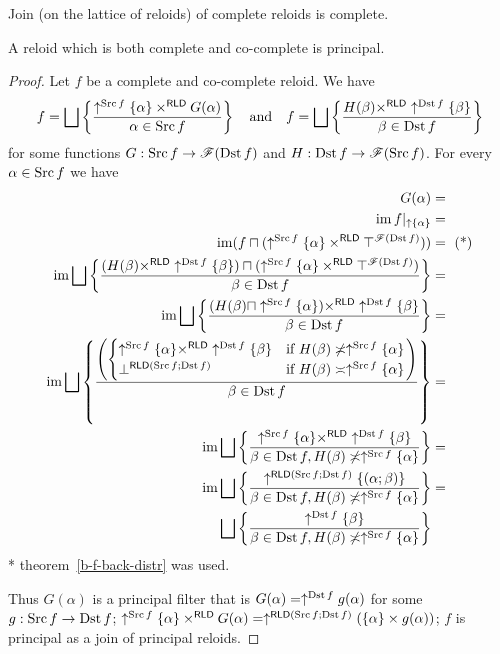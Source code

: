 \begin{obvious}
Join (on the lattice of reloids) of complete reloids is complete.\end{obvious}
\begin{thm}
A reloid which is both complete and co-complete is principal.\end{thm}
\begin{proof}
Let $f$ be a complete and co-complete reloid. We have
\[
f=\bigsqcup\left\{ \frac{\uparrow^{\operatorname{Src} f}\{\alpha\}\times^{\mathsf{RLD}}G(\alpha)}{\alpha\in\operatorname{Src} f}\right\}\quad\text{and}\quad f=\bigsqcup\left\{ \frac{H(\beta)\times^{\mathsf{RLD}}\uparrow^{\operatorname{Dst} f}\{\beta\}}{\beta\in\operatorname{Dst} f}\right\}
\]
for some functions $G:\operatorname{Src} f\rightarrow\mathscr{F}(\operatorname{Dst} f)$ and $H:\operatorname{Dst} f\rightarrow\mathscr{F}(\operatorname{Src} f)$.
For every $\alpha\in\operatorname{Src} f$ we have
\begin{align*}
G(\alpha) & =\\
\operatorname{im} f|_{\uparrow \{\alpha\}} & =\\
\operatorname{im}(f\sqcap(\uparrow^{\operatorname{Src} f}\{\alpha\}\times^{\mathsf{RLD}}\top^{\mathscr{F}(\operatorname{Dst} f)})) & =\text{ (*)}\\
\operatorname{im}\bigsqcup\left\{ \frac{(H(\beta)\times^{\mathsf{RLD}}\uparrow^{\operatorname{Dst} f}\{\beta\})\sqcap(\uparrow^{\operatorname{Src} f}\{\alpha\}\times^{\mathsf{RLD}}\top^{\mathscr{F}(\operatorname{Dst} f)})}{\beta\in\operatorname{Dst} f}\right\} & =\\
\operatorname{im}\bigsqcup\left\{ \frac{(H(\beta)\sqcap\uparrow^{\operatorname{Src} f}\{\alpha\})\times^{\mathsf{RLD}}\uparrow^{\operatorname{Dst} f}\{\beta\}}{\beta\in\operatorname{Dst} f}\right\} & =\\
\operatorname{im}\bigsqcup\left\{ \frac{\left(\begin{cases}
\uparrow^{\operatorname{Src} f}\{\alpha\}\times^{\mathsf{RLD}}\uparrow^{\operatorname{Dst} f}\{\beta\} & \text{if }H(\beta)\not\asymp\uparrow^{\operatorname{Src} f}\{\alpha\}\\
\bot^{\mathsf{RLD}(\operatorname{Src} f;\operatorname{Dst} f)} & \text{if }H(\beta)\asymp\uparrow^{\operatorname{Src} f}\{\alpha\}
\end{cases}\right)}{\beta\in\operatorname{Dst} f}\right\} & =\\
\operatorname{im}\bigsqcup\left\{ \frac{\uparrow^{\operatorname{Src} f}\{\alpha\}\times^{\mathsf{RLD}}\uparrow^{\operatorname{Dst} f}\{\beta\}}{\beta\in\operatorname{Dst} f,H(\beta)\not\asymp\uparrow^{\operatorname{Src} f}\{\alpha\}}\right\} & =\\
\operatorname{im}\bigsqcup\left\{ \frac{\uparrow^{\mathsf{RLD}(\operatorname{Src} f;\operatorname{Dst} f)}\{(\alpha;\beta)\}}{\beta\in\operatorname{Dst} f,H(\beta)\not\asymp\uparrow^{\operatorname{Src} f}\{\alpha\}}\right\} & =\\
\bigsqcup\left\{ \frac{\uparrow^{\operatorname{Dst} f}\{\beta\}}{\beta\in\operatorname{Dst} f,H(\beta)\not\asymp\uparrow^{\operatorname{Src} f}\{\alpha\}}\right\}
\end{align*}
{*} theorem~\ref{b-f-back-distr} was used.

Thus $G(\alpha)$ is a principal filter that is $G(\alpha)=\uparrow^{\operatorname{Dst} f}g(\alpha)$
for some $g:\operatorname{Src} f\rightarrow\operatorname{Dst} f$; $\uparrow^{\operatorname{Src} f}\{\alpha\}\times^{\mathsf{RLD}}G(\alpha)=\uparrow^{\mathsf{RLD}(\operatorname{Src} f;\operatorname{Dst} f)}(\{\alpha\}\times g(\alpha))$;
$f$ is principal as a join of principal reloids.\end{proof}
